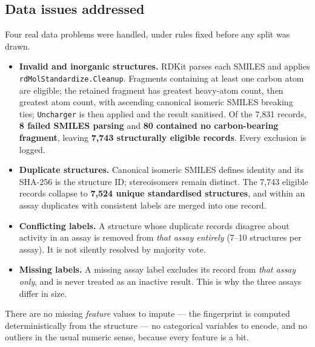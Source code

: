 \documentclass[10pt,letterpaper]{article}
\begin{document}
\subsection{Data issues addressed}

Four real data problems were handled, under rules fixed before any split was drawn.

\begin{itemize}\setlength{\itemsep}{1pt}
\item \textbf{Invalid and inorganic structures.} RDKit parses each SMILES and applies
\texttt{rdMolStandardize.Cleanup}. Fragments containing at least one carbon atom are eligible; the
retained fragment has greatest heavy-atom count, then greatest atom count, with ascending canonical
isomeric SMILES breaking ties; \texttt{Uncharger} is then applied and the result sanitised. Of the
7{,}831 records, \textbf{8 failed SMILES parsing} and \textbf{80 contained no carbon-bearing
fragment}, leaving \textbf{7{,}743 structurally eligible records}. Every exclusion is logged.
\item \textbf{Duplicate structures.} Canonical isomeric SMILES defines identity and its SHA-256 is
the structure ID; stereoisomers remain distinct. The 7{,}743 eligible records collapse to
\textbf{7{,}524 unique standardised structures}, and within an assay duplicates with consistent
labels are merged into one record.
\item \textbf{Conflicting labels.} A structure whose duplicate records disagree about activity in an
assay is removed from \emph{that assay entirely} (7--10 structures per assay). It is not silently
resolved by majority vote.
\item \textbf{Missing labels.} A missing assay label excludes its record from \emph{that assay
only}, and is never treated as an inactive result. This is why the three assays differ in size.
\end{itemize}

There are no missing \emph{feature} values to impute --- the fingerprint is computed
deterministically from the structure --- no categorical variables to encode, and no outliers in the
usual numeric sense, because every feature is a bit.
\end{document}
